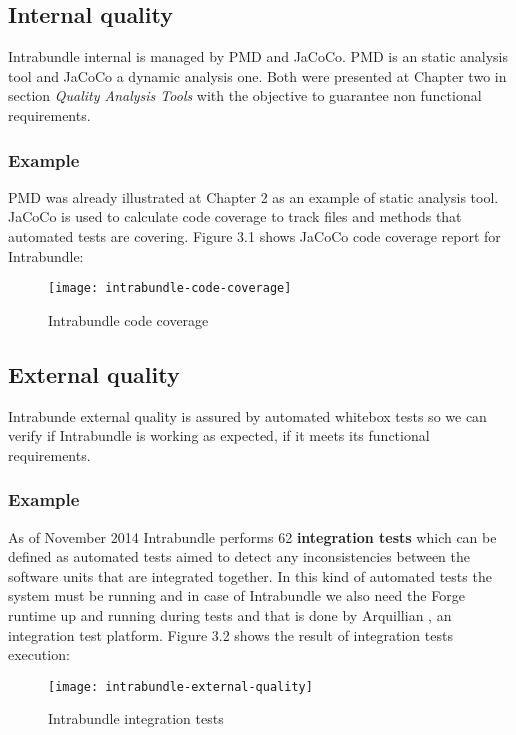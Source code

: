 \subsection{Internal quality}
Intrabundle internal is managed by PMD and JaCoCo. PMD is an static analysis tool and JaCoCo a dynamic analysis one. Both were presented at Chapter two in section \textit{Quality Analysis Tools} with the objective to guarantee non functional requirements.

\subsubsection{Example}
 PMD was already illustrated at Chapter 2 as an example of static analysis tool. JaCoCo is used to calculate code coverage to track files and methods that automated tests are covering. Figure 3.1 shows JaCoCo code coverage report for Intrabundle:

\begin{figure}[h]
\caption{Intrabundle code coverage}
\texttt{[image: intrabundle-code-coverage]}
\end{figure}

\FloatBarrier

\subsection{External quality}
Intrabunde external quality is assured by automated whitebox tests so we can verify if Intrabundle is working as expected, if it meets its functional requirements.

\subsubsection{Example}
As of November 2014 Intrabundle performs 62 \textbf{integration tests} which can be defined as automated tests aimed to detect any inconsistencies between the software units that are integrated together. In this kind of automated tests the system must be running and in case of Intrabundle we also need the Forge runtime up and running during tests and that is done by Arquillian \citep{dan 2011}, an integration test platform. Figure 3.2 shows the result of integration tests execution:

\begin{figure}[h]
\caption{Intrabundle integration tests}
\texttt{[image: intrabundle-external-quality]}
\end{figure}

\FloatBarrier